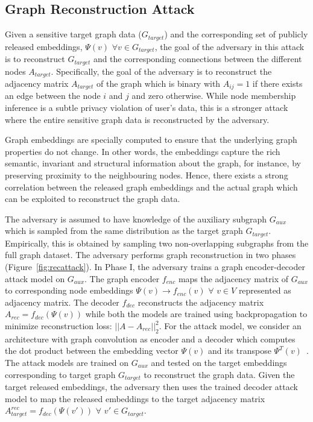 \subsection{Graph Reconstruction Attack}

Given a sensitive target graph data ($G_{target}$) and the corresponding set of publicly released embeddings, $\Psi (v)$ $\forall v \in G_{target}$, the goal of the adversary in this attack is to reconstruct $G_{target}$ and the corresponding connections between the different nodes $A_{target}$.
Specifically, the goal of the adversary is to reconstruct the adjacency matrix $A_{target}$ of the graph which is binary with $A_{ij}=1$ if there exists an edge between the node $i$ and $j$ and zero otherwise.
While node membership inference is a subtle privacy violation of user's data, this is a stronger attack where the entire sensitive graph data is reconstructed by the adversary.

Graph embeddings are specially computed to ensure that the underlying graph properties do not change.
In other words, the embeddings capture the rich semantic, invariant and structural information about the graph, for instance, by preserving proximity to the neighbouring nodes.
Hence, there exists a strong correlation between the released graph embeddings and the actual graph which can be exploited to reconstruct the graph data.




The adversary is assumed to have knowledge of the auxiliary subgraph $G_{aux}$ which is sampled from the same distribution as the target graph $G_{target}$.
Empirically, this is obtained by sampling two non-overlapping subgraphs from the full graph dataset.
The adversary performs graph reconstruction in two phases (Figure~\ref{fig:recattack}).
In Phase I, the adversary trains a graph encoder-decoder attack model on $G_{aux}$.
The graph encoder $f_{enc}$ maps the adjacency matrix of $G_{aux}$ to corresponding node embeddings $\Psi (v)\rightarrow f_{enc}(v)$ $\forall$ $v \in V$ represented as adjacency matrix.
The decoder $f_{dec}$ reconstructs the adjacency matrix $A_{rec} = f_{dec}(\Psi (v))$ while both the models are trained using backpropagation to minimize reconstruction loss: $||A - A_{rec}||_2^2$.
For the attack model, we consider an architecture with graph convolution as encoder and a decoder which computes the dot product between the embedding vector $\Psi (v)$ and its transpose $\Psi^T (v)$~\cite{Kipf2016tc}.
The attack models are trained on $G_{aux}$ and tested on the target embeddings corresponding to target graph $G_{target}$ to reconstruct the graph data.
Given the target released embeddings, the adversary then uses the trained decoder attack model to map the released embeddings to the target adjacency matrix $A_{target}^{rec} = f_{dec}(\Psi (v'))$ $\forall$ $v'\in G_{target}$.\\




